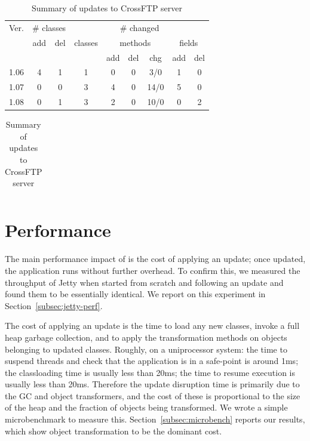 \begin{table}
\begin{footnotesize}
\begin{center}
\begin{tabular}{|l||c|c||c|c|c|c|c|c|} \hline
Ver.   & \multicolumn{2}{c||}{\# classes} &    \multicolumn{6}{c|}{\# changed}             \\
       & add & del & classes & \multicolumn{3}{c|}{methods} & \multicolumn{2}{c|}{fields}  \\
       &     &     &         & add & del & chg   & add & del                               \\ \hline \hline
1.06   & 4   & 1   & 1       & 0   & 0   & 3/0   & 1   & 0                                 \\
1.07   & 0   & 0   & 3       & 4   & 0   & 14/0  & 5   & 0                                 \\
1.08   & 0   & 1   & 3       & 2   & 0   & 10/0  & 0   & 2                                 \\ \hline
\end{tabular}
\end{center}
\begin{tabular}{l}
\end{tabular}
\end{footnotesize}
\caption{Summary of updates to CrossFTP server}
\label{tab:crossftp-changes}
\end{table}

\section{Performance}
\label{sec:performance}

The main performance impact of \DSU{} is the cost of applying an update;
once updated, the application runs without further overhead.  To confirm
this, we measured the throughput of Jetty when started from scratch and
following an update and found them to be essentially identical.  We report
on this experiment in Section~\ref{subsec:jetty-perf}.

The cost of applying an update is the time to load any new classes, invoke a
full heap garbage collection, and to apply the transformation methods on
objects belonging to updated classes.
Roughly, on a uniprocessor system: the time to suspend threads and check
that the application is in a safe-point is around 1ms; the classloading
time is usually less than 20ms; the time to resume execution is usually
less than 20ms. 
Therefore the update disruption time is primarily
due to the GC and object transformers, and the cost of these is proportional
to the size of the heap and the fraction of objects being transformed.  We
wrote a simple microbenchmark to measure this.
Section~\ref{subsec:microbench} reports our results, which show object
transformation to be the dominant cost.

